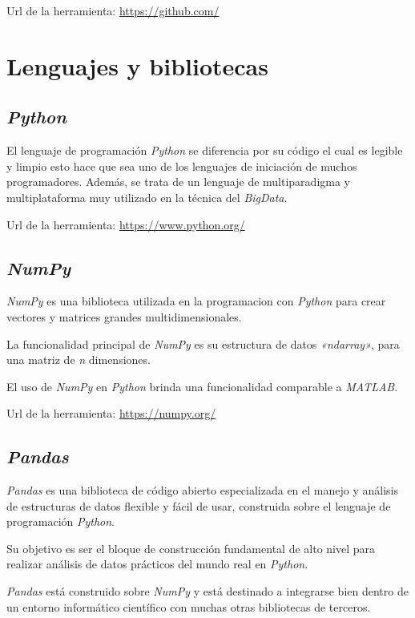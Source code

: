 Url de la herramienta: \url{https://github.com/}


\section{Lenguajes y bibliotecas}

\subsection{\textit{Python}}

El lenguaje de programación \textit{Python} se diferencia por su código el cual es legible y limpio esto hace que sea uno de los lenguajes de iniciación de muchos programadores. Además, se trata de un lenguaje de multiparadigma y multiplataforma muy utilizado en la técnica del \textit{BigData}.

Url de la herramienta: \url{https://www.python.org/}

\subsection{\textit{NumPy}}

\textit{NumPy} es una biblioteca utilizada en la programacion con \textit{Python} para crear vectores y matrices grandes multidimensionales.

La funcionalidad principal de \textit{NumPy} es su estructura de datos \textit{«ndarray»}, para una matriz de \textit{n} dimensiones.

El uso de \textit{NumPy} en \textit{Python} brinda una funcionalidad comparable a \textit{MATLAB}.

Url de la herramienta: \url{https://numpy.org/}

\subsection{\textit{Pandas}}

\textit{Pandas} es una biblioteca de código abierto especializada en el manejo y análisis de estructuras de datos flexible y fácil de usar, construida sobre el lenguaje de programación \textit{Python}.

Su objetivo es ser el bloque de construcción fundamental de alto nivel para realizar análisis de datos prácticos del mundo real en \textit{Python}.

\textit{Pandas} está construido sobre \textit{NumPy} y está destinado a integrarse bien dentro de un entorno informático científico con muchas otras bibliotecas de terceros.

